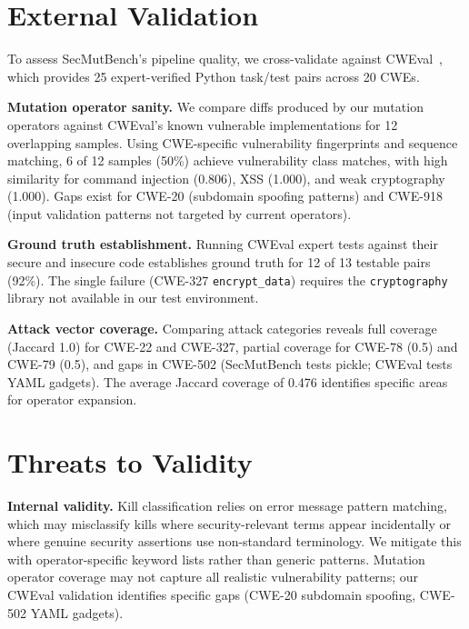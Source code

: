 \documentclass[sigconf,review,anonymous]{acmart}
\begin{document}
\section{External Validation}\label{sec:validation}

To assess SecMutBench's pipeline quality, we cross-validate against CWEval~\cite{yang2024cweval}, which provides 25 expert-verified Python task/test pairs across 20 CWEs.

\textbf{Mutation operator sanity.} We compare diffs produced by our mutation operators against CWEval's known vulnerable implementations for 12 overlapping samples. Using CWE-specific vulnerability fingerprints and sequence matching, 6 of 12 samples (50\%) achieve vulnerability class matches, with high similarity for command injection (0.806), XSS (1.000), and weak cryptography (1.000). Gaps exist for CWE-20 (subdomain spoofing patterns) and CWE-918 (input validation patterns not targeted by current operators).

\textbf{Ground truth establishment.} Running CWEval expert tests against their secure and insecure code establishes ground truth for 12 of 13 testable pairs (92\%). The single failure (CWE-327 \texttt{encrypt\_data}) requires the \texttt{cryptography} library not available in our test environment.

\textbf{Attack vector coverage.} Comparing attack categories reveals full coverage (Jaccard 1.0) for CWE-22 and CWE-327, partial coverage for CWE-78 (0.5) and CWE-79 (0.5), and gaps in CWE-502 (SecMutBench tests pickle; CWEval tests YAML gadgets). The average Jaccard coverage of 0.476 identifies specific areas for operator expansion.


\section{Threats to Validity}\label{sec:threats}

\textbf{Internal validity.} Kill classification relies on error message pattern matching, which may misclassify kills where security-relevant terms appear incidentally or where genuine security assertions use non-standard terminology. We mitigate this with operator-specific keyword lists rather than generic patterns. Mutation operator coverage may not capture all realistic vulnerability patterns; our CWEval validation identifies specific gaps (CWE-20 subdomain spoofing, CWE-502 YAML gadgets).
\end{document}
